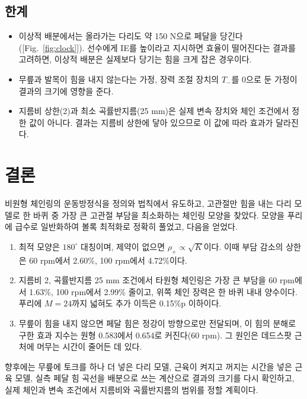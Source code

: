 \subsection{한계}
\begin{itemize}
\item 이상적 배분에서는 올라가는 다리도 약 150 N으로 페달을 당긴다([Fig.~\ref{fig:clock}]). 선수에게 IE를 높이라고 지시하면 효율이 떨어진다는 결과\cite{bini2013}를 고려하면, 이상적 배분은 실제보다 당기는 힘을 크게 잡은 경우이다.
\item 무릎과 발목이 힘을 내지 않는다는 가정, 장력 조절 장치의 \(T_-\)를 0으로 둔 가정이 결과의 크기에 영향을 준다.
\item 지름비 상한(2)과 최소 곡률반지름(25 mm)은 실제 변속 장치와 체인 조건에서 정한 값이 아니다. 결과는 지름비 상한에 닿아 있으므로 이 값에 따라 효과가 달라진다.
\end{itemize}

\section{결론}
비원형 체인링의 운동방정식을 정의와 법칙에서 유도하고, 고관절만 힘을 내는 다리 모델로 한 바퀴 중 가장 큰 고관절 부담을 최소화하는 체인링 모양을 찾았다. 모양을 푸리에 급수로 일반화하여 볼록 최적화로 정확히 풀었고, 다음을 얻었다.
\begin{enumerate}
\item 최적 모양은 \(180^\circ\) 대칭이며, 제약이 없으면 \(\rho_+\propto\sqrt K\)이다. 이때 부담 감소의 상한은 60 rpm에서 2.60\%, 100 rpm에서 4.72\%이다.
\item 지름비 2, 곡률반지름 25 mm 조건에서 타원형 체인링은 가장 큰 부담을 60 rpm에서 1.63\%, 100 rpm에서 2.99\% 줄이고, 위쪽 체인 장력은 한 바퀴 내내 양수이다. 푸리에 \(M=24\)까지 넓혀도 추가 이득은 0.15\%p 이하이다.
\item 무릎이 힘을 내지 않으면 페달 힘은 정강이 방향으로만 전달되며, 이 힘의 분해로 구한 효과 지수는 원형 0.583에서 0.654로 커진다(60 rpm). 그 원인은 데드스팟 근처에 머무는 시간이 줄어든 데 있다.
\end{enumerate}

향후에는 무릎에 토크를 하나 더 넣은 다리 모델, 근육이 켜지고 꺼지는 시간을 넣은 근육 모델, 실측 페달 힘 곡선을 배분으로 쓰는 계산으로 결과의 크기를 다시 확인하고, 실제 체인과 변속 조건에서 지름비와 곡률반지름의 범위를 정할 계획이다.
